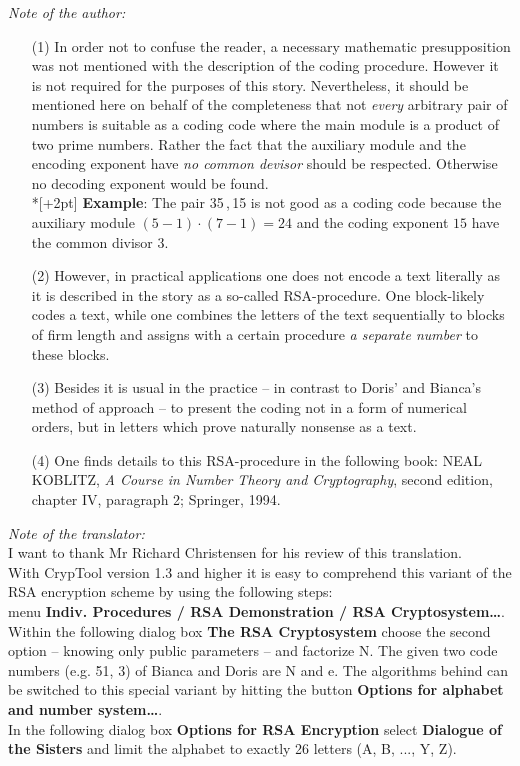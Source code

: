 \noindent
{\em Note of the author:\/}
\begin{itemize}
\item[(1)] In order not to confuse the reader, a necessary mathematic
  presupposition was not mentioned with the description of the coding
  procedure.  However it is not required for the purposes of this story.
  Nevertheless, it should be mentioned here on behalf of the completeness
  that not {\em every\/} arbitrary pair of numbers is suitable as a coding
  code where the main module is a product of two prime numbers.  Rather
  the fact that the auxiliary module and the encoding
  exponent have {\em no common devisor\/} should be respected.
  Otherwise no decoding exponent would be found. \\*[+2pt]
  {\bf Example}: The pair 35\,,\,15 is not good as a coding code
  because the auxiliary module \((5-1) \cdot (7-1) =24\) and the coding
  exponent \(15\) have the common divisor \(3\).
\item[(2)] However, in practical applications one does not encode a text literally
as it is described in the story as a so-called RSA-procedure.  One
block-likely codes a text, while one combines the letters of the text
sequentially to blocks of firm length and assigns with a certain procedure
{\em a separate number\/} to these blocks.

\item[(3)] Besides it is usual in the practice -- in contrast to Doris' and
Bianca's method of approach -- to present the coding not in a form of
numerical orders, but in letters which prove naturally nonsense as a text.

\item[(4)] One finds details to this RSA-procedure in the following book: {\small
  NEAL KOBLITZ}, {\em A Course in Number Theory and Cryptography\/},
second edition, chapter IV, paragraph 2; Springer, 1994. \\
\end{itemize}
\[\]
\hrulefill
\[\]
\[\]
{\em Note of the translator:} \\
I want to thank Mr Richard Christensen for his review of this translation.
\\[1ex]
With CrypTool version 1.3 and higher it is easy to comprehend this variant of the RSA encryption scheme by using 
the following steps: \\
menu {\bf Indiv. Procedures / RSA Demonstration / RSA Cryptosystem\dots}. \\
Within the following dialog box {\bf The RSA Cryptosystem} choose the second option -- knowing only public parameters -- and factorize N. The given 
two code numbers (e.g. 51, 3) of Bianca and Doris are N and e. The algorithms behind can be switched to this 
special variant by hitting the button \textbf{Options for alphabet and number system\dots}. \\
In the following dialog 
box {\bf Options for RSA Encryption} select \textbf{Dialogue of the Sisters} and limit the alphabet to exactly 26 
letters (A, B, ..., Y, Z).





